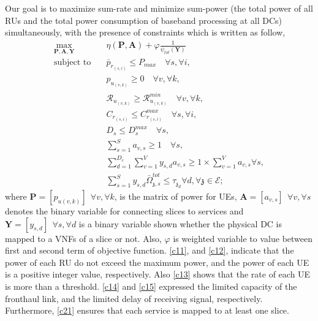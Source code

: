 \documentclass[conference]{IEEEtran}
\begin{document}
Our goal is to maximize sum-rate and minimize sum-power (the total power of all RUs and the total power consumption of baseband processing at all DCs) simultaneously, with the presence of constraints which is written as follow,
\begin{subequations}
\begin{alignat}{4}
\max\limits_{\boldsymbol{P}, \boldsymbol{A}, \boldsymbol{Y} }   \quad &  \eta(\boldsymbol{P},\boldsymbol{A})+ \varphi \frac{1}{\psi_{tot}(\boldsymbol{Y})} \\
\text{subject to} \quad  & \bar{p}_{r_{(s,i)}} \leq P_{max} \quad \forall s, \forall i,
 \label{c11} \\
&p_{u_{(v,k)}}  \geq 0  \quad \forall v, \forall k,\label{c12} \\
&\mathcal{R}_{u_{(v,k)}} \geq  \mathcal{R}_{u_{(v,k)}}^{min} \quad \forall v, \forall k,\label{c13} \\
&C_{r_{(s,i)}} \leq C_{r_{(s,i)}}^{max} \quad \forall s, \forall i, \label{c14}\\
&D_{s} \leq D_{s}^{max} \quad \forall s,\label{c15} \\
& \textstyle  \sum_{s=1}^{S}a_{v,s} \geq 1 \quad \forall s, \label{c21} \\
& \textstyle  \sum_{d=1}^{D_c}\sum_{v=1}^{V}y_{s,d}a_{v,s} \geq 1\times\sum_{v=1}^{V}a_{v,s} \forall s,\label{c23} \\
 &\textstyle \sum_{s=1}^{S} y_{s,d} \bar{\Omega}_{\mathfrak{z},s}^{tot}  \leq   \tau_{\mathfrak{z}_d}  \forall d, \forall \mathfrak{z}\in \mathcal{E}; \label{c22}
\end{alignat}
\label{constraints}
\end{subequations}
where $\boldsymbol{P} =[p_{u(v,k)}] \:\: \forall v , \forall k $, is the matrix of power for UEs, $\boldsymbol{A} =[a_{v,s}] \:\: \forall v , \forall s $ denotes the binary variable for connecting slices to services and $\boldsymbol{Y} =[y_{s,d}]  \:\: \forall s ,  \forall d $ is a binary variable shown whether
the physical DC is mapped to a VNFs of a slice or not.
Also, $\varphi$ is weighted variable to value between first and second term of objective function.
\eqref{c11}, and \eqref{c12}, indicate that the power of each RU do not exceed the maximum power, and the power of each UE is a positive integer value, respectively. Also \eqref{c13} shows that the rate of each UE is more than a threshold. \eqref{c14} and \eqref{c15} expressed the limited capacity of the fronthaul link, and the limited delay of receiving signal, respectively.
Furthermore, \eqref{c21}
ensures that each service is mapped to at least one slice.
\end{document}
